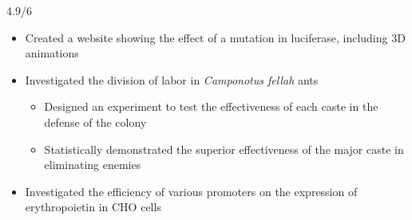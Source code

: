 \documentclass[11pt,a4paper,sans]{moderncv}        %
\begin{document}
{4.9/6}{
\begin{itemize}
	\item Created a website showing the effect of a mutation in luciferase, including 3D animations
	\item Investigated the division of labor in \textit{Camponotus fellah} ants
	\begin{itemize}
		\item Designed an experiment to test the effectiveness of each caste in the defense of the colony
		\item Statistically demonstrated the superior effectiveness of the major caste in eliminating enemies
	\end{itemize}
	\item Investigated the efficiency of various promoters on the expression of erythropoietin in CHO cells
\end{itemize}}\vspace*{-.5\baselineskip}
\vspace*{-\baselineskip}

\end{document}
